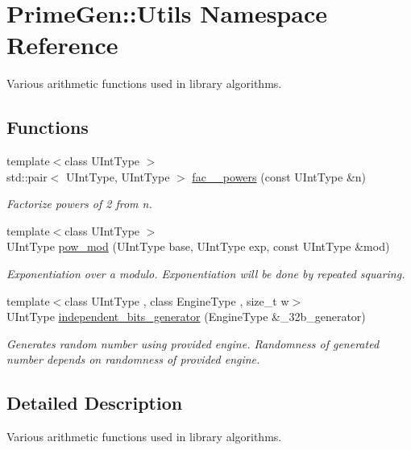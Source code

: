 \hypertarget{namespace_prime_gen_1_1_utils}{\section{Prime\-Gen\-:\-:Utils Namespace Reference}
\label{namespace_prime_gen_1_1_utils}
}


Various arithmetic functions used in library algorithms.  


\subsection*{Functions}
\begin{DoxyCompactItemize}
\item 
{\footnotesize template$<$class U\-Int\-Type $>$ }\\std\-::pair$<$ U\-Int\-Type, U\-Int\-Type $>$ \hyperlink{namespace_prime_gen_1_1_utils_a9d2674731aefc0e54322e023c1629a14}{fac\-\_\-\_\-powers} (const U\-Int\-Type \&n)
\begin{DoxyCompactList}\small\item\em Factorize powers of 2 from n. \end{DoxyCompactList}\item 
{\footnotesize template$<$class U\-Int\-Type $>$ }\\U\-Int\-Type \hyperlink{namespace_prime_gen_1_1_utils_a640cffdfe9303cbe0eb0205165c3161e}{pow\-\_\-mod} (U\-Int\-Type base, U\-Int\-Type exp, const U\-Int\-Type \&mod)
\begin{DoxyCompactList}\small\item\em Exponentiation over a modulo. Exponentiation will be done by repeated squaring. \end{DoxyCompactList}\item 
{\footnotesize template$<$class U\-Int\-Type , class Engine\-Type , size\-\_\-t w$>$ }\\U\-Int\-Type \hyperlink{namespace_prime_gen_1_1_utils_a279cd6b89aca43a9597f58aa4a7b5807}{independent\-\_\-bits\-\_\-generator} (Engine\-Type \&\-\_\-32b\-\_\-generator)
\begin{DoxyCompactList}\small\item\em Generates random number using provided engine. Randomness of generated number depends on randomness of provided engine. \end{DoxyCompactList}\end{DoxyCompactItemize}


\subsection{Detailed Description}
Various arithmetic functions used in library algorithms. 

